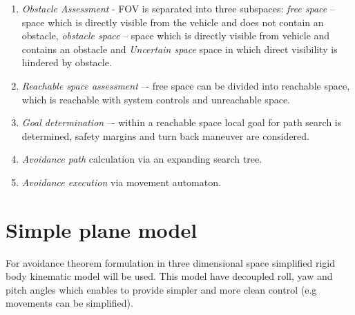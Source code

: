\begin{enumerate}
    \item \textit{Obstacle Assessment} - FOV is separated into three subspaces: \textit{free space} – space which is directly visible from the vehicle and does not contain an obstacle, \textit{obstacle space} – space which is directly visible from vehicle and contains an obstacle and \textit{Uncertain space}  space in which direct visibility is hindered by obstacle.
    \item \textit{Reachable space assessment} –- free space can be divided into reachable space, which is reachable with system controls and unreachable space.
    \item \textit{Goal determination} –- within a reachable space local goal for path search is determined, safety margins and turn back maneuver are considered.
    \item \textit{Avoidance path}  calculation via an expanding search tree.
    \item \textit{Avoidance execution} via movement automaton.
\end{enumerate}

\section{Simple plane model}\label{sec:3DsimplisticplaneModel}
\noindent For avoidance theorem formulation in three dimensional space simplified rigid body kinematic model will be used. This model have decoupled roll, yaw and pitch angles which enables to provide simpler and more clean control (e.g movements can be simplified). 

